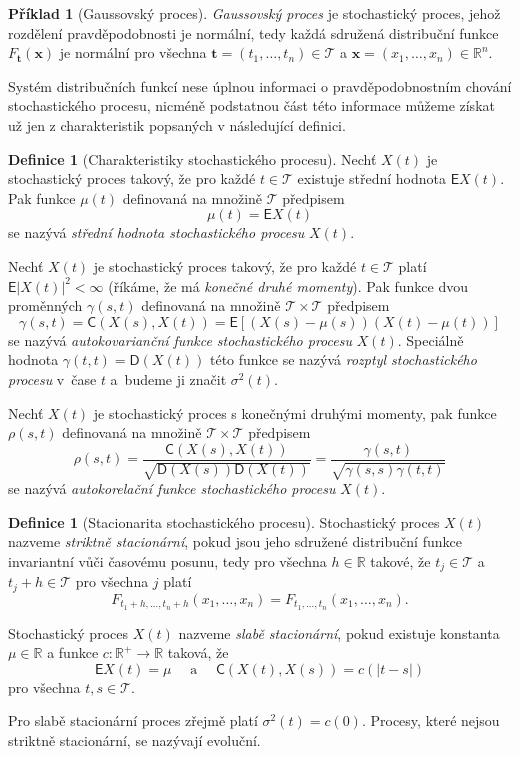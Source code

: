 \documentclass[a4paper,12pt]{report}
\theoremstyle{definition} \newtheorem{definice}[veta]{Definice}
\newtheorem{priklad}{Příklad}
\theoremstyle{remark}
\begin{document}
\begin{priklad}[Gaussovský proces]
\textit{Gaussovský proces} je stochastický proces, jehož rozdělení pravděpodobnosti je normální, tedy každá sdružená distribuční funkce $F_{\boldsymbol{t}}(\boldsymbol{x})$ je normální pro všechna $\boldsymbol{t}=(t_1,\dots,t_n)\in \mathcal{T}$ a $\boldsymbol{x}=(x_1,\dots,x_n)\in \mathbb{R}^n$.
\end{priklad}

Systém distribučních funkcí nese úplnou informaci o pravděpodobnostním chování stochastického procesu, nicméně podstatnou část této informace můžeme získat už jen z charakteristik popsaných v následující definici.

\begin{definice}[Charakteristiky stochastického procesu]
Nechť $X(t)$ je stochastický proces takový, že pro každé $t\in \mathcal{T}$ existuje střední hodnota $\mathsf{E}{X(t)}$.
Pak funkce $\mu(t)$ definovaná na množině $\mathcal{T}$ předpisem
$$\mu(t)=\mathsf{E}{X(t)}$$
se nazývá \textit{střední hodnota stochastického procesu} $X(t)$.

Nechť $X(t)$ je stochastický proces takový, že pro každé $t\in\mathcal{T}$ platí $\mathsf{E}{|X(t)|^2<\infty}$ (říkáme, že má \textit{konečné druhé momenty}).
Pak funkce dvou proměnných $\gamma(s,t)$ definovaná na množině $\mathcal{T}\times \mathcal{T}$ předpisem
$$\gamma(s,t)=\mathsf{C}(X(s),X(t))=\mathsf{E}{\left[(X(s)-\mu(s))(X(t)-\mu(t))\right]}$$
se nazývá \textit{autokovarianční funkce stochastického procesu} $X(t)$.  
Speciálně hodnota $\gamma(t,t)=\mathsf{D}(X(t))$ této funkce se nazývá \textit{rozptyl stochastického procesu} v~čase $t$ a~budeme ji značit ${\sigma^2(t)}$.

Nechť $X(t)$ je stochastický proces s konečnými druhými momenty,
pak funkce $\rho(s,t)$ definovaná na množině $\mathcal{T}\times\mathcal{T}$ předpisem
$$\rho(s,t)=\frac{\mathsf{C}(X(s),X(t))}{\sqrt{\mathsf{D}(X(s))\mathsf{D}(X(t))}}=\frac{\gamma(s,t)}{\sqrt{\gamma(s,s)\gamma(t,t)}}$$
se nazývá \textit{autokorelační funkce stochastického procesu} $X(t)$.
\end{definice}

\begin{definice}[Stacionarita stochastického procesu]
Stochastický proces $X(t)$ nazveme \textit{striktně stacionární}, pokud jsou jeho sdružené distribuční funkce invariantní vůči časovému posunu, tedy pro všechna $h\in\mathbb{R}$ takové, že $t_j\in\mathcal{T}$ a $t_j+h\in\mathcal{T}$ pro všechna $j$ platí
$$F_{t_1+h,\dots,t_n+h}(x_1,\dots,x_n)=F_{t_1,\dots,t_n}(x_1,\dots,x_n).$$   

Stochastický proces $X(t)$ nazveme \textit{slabě stacionární}, pokud existuje konstanta $\mu\in\mathbb{R}$ a funkce $c:\mathbb{R}^+\to\mathbb{R}$ taková, že
$$\mathsf{E}{X(t)}=\mu\quad\text{ a }\quad\mathsf{C}(X(t),X(s))=c(|t-s|)$$
pro všechna $t,s\in\mathcal{T}$.
\end{definice}
Pro slabě stacionární proces zřejmě platí $\sigma^2(t)=c(0)$.
Procesy, které nejsou striktně stacionární, se nazývají evoluční. 
\end{document}
